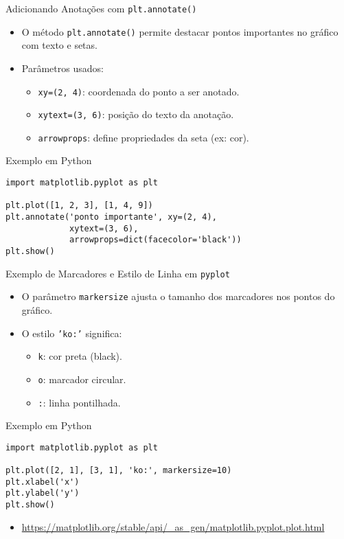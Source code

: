 \begin{frame}[fragile]{Adicionando Anotações com \texttt{plt.annotate()}}
    \begin{itemize}
        \item O método \texttt{plt.annotate()} permite destacar pontos importantes no gráfico com texto e setas.
        \item Parâmetros usados:
        \begin{itemize}
            \item \texttt{xy=(2, 4)}: coordenada do ponto a ser anotado.
            \item \texttt{xytext=(3, 6)}: posição do texto da anotação.
            \item \texttt{arrowprops}: define propriedades da seta (ex: cor).
        \end{itemize}
    \end{itemize}

    \begin{block}{Exemplo em Python}
\begin{verbatim}
import matplotlib.pyplot as plt

plt.plot([1, 2, 3], [1, 4, 9])
plt.annotate('ponto importante', xy=(2, 4),
             xytext=(3, 6),
             arrowprops=dict(facecolor='black'))
plt.show()
\end{verbatim}
    \end{block}
\end{frame}


\begin{frame}[fragile]{Exemplo de Marcadores e Estilo de Linha em \texttt{pyplot}}
    \begin{itemize}
        \item O parâmetro \texttt{markersize} ajusta o tamanho dos marcadores nos pontos do gráfico.
        \item O estilo \texttt{'ko:'} significa:
        \begin{itemize}
            \item \texttt{k}: cor preta (black).
            \item \texttt{o}: marcador circular.
            \item \texttt{:}: linha pontilhada.
        \end{itemize}
    \end{itemize}

    \begin{block}{Exemplo em Python}
\begin{verbatim}
import matplotlib.pyplot as plt

plt.plot([2, 1], [3, 1], 'ko:', markersize=10)
plt.xlabel('x')
plt.ylabel('y')
plt.show()
\end{verbatim}
    \end{block}
\begin{itemize}
    \item  \url{https://matplotlib.org/stable/api/_as_gen/matplotlib.pyplot.plot.html}
\end{itemize}
\end{frame}

